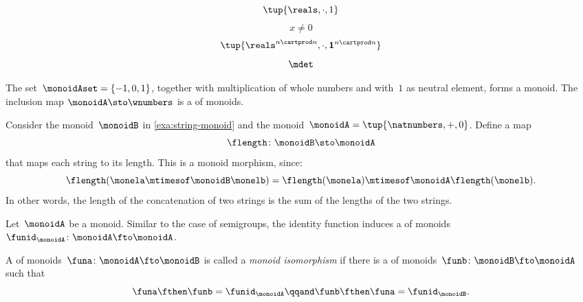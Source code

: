 {\begin{forslides}
        \begin{equation}
            \label{eq:reals-times-one}
            \tup{\reals , \cdot, 1}
        \end{equation}
        \begin{equation}
            \label{eq:reals-times-one-non}
            x \neq 0
        \end{equation}
        \begin{equation}
            \label{eq:matrices-times}
            \tup{\reals^{n\cartprod n}, \cdot, \mathbf{1}^{n\cartprod n}}
        \end{equation}
        \begin{equation}
            \label{eq:det}
            \mdet
        \end{equation}
    \end{forslides}
}%

\begin{example}
    The set~$\monoidAset = \{ -1, 0, 1 \}$, together with multiplication of whole numbers and with~$1$ as neutral element, forms a monoid.
    The inclusion map $\monoidA \sto \wnumbers$ is a \whomo of monoids.
\end{example}

\begin{example}
    \label{exa:string-length}
    Consider the monoid~$\monoidB$ in \cref{exa:string-monoid} and the monoid~$\monoidA=\tup{\natnumbers, +,0}$.
    Define a map
    \begin{equation*}
        \flength \colon \monoidB \sto \monoidA
    \end{equation*}
    that maps each string to its length.
    This is a monoid morphism, since:
    \begin{equation*}
        \flength(\monela \mtimesof\monoidB \monelb)=\flength(\monela)\mtimesof\monoidA \flength(\monelb).
    \end{equation*}
    In other words, the length of the concatenation of two strings is the sum of the lengths of the two strings.
\end{example}

\begin{ctdefinition}
    \label{def:identity-mon-mor}
    Let~$\monoidA$ be a monoid.
    Similar to the case of semigroups, the identity function induces a \whomo of monoids~$\funid_\monoidA\colon \monoidA \fto \monoidA$.
\end{ctdefinition}

\begin{ctdefinition}
    \label{def:monoid-iso}
    A \whomo of monoids~$\funa\colon \monoidA \fto \monoidB$ is called a \emph{monoid isomorphism} if there is a \whomo of monoids~$\funb\colon \monoidB \fto \monoidA$ such that
    \begin{equation}
        \funa \fthen \funb = \funid_\monoidA \qqand \funb \fthen \funa = \funid_\monoidB.
    \end{equation}
\end{ctdefinition}

